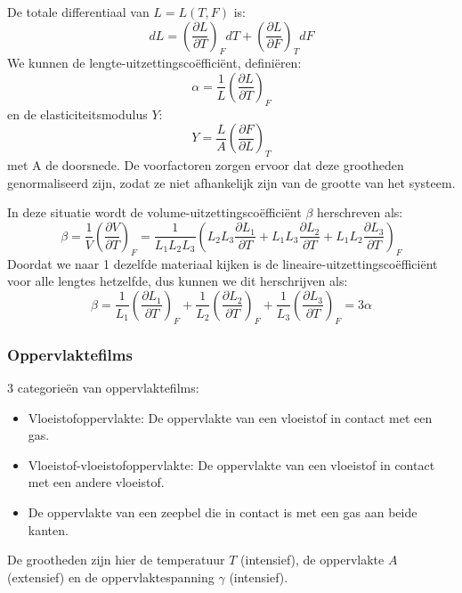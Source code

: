 De totale differentiaal van \(L=L(T,F)\) is:
\[dL = \left( \frac{\partial L}{\partial T} \right)_F dT + \left( \frac{\partial L}{\partial F} \right)_T dF\]
We kunnen de lengte-uitzettingscoëfficiënt, definiëren:
\begin{equation}
    \label{eq: lengte-uitzettingscoefficient}
    \alpha = \frac{1}{L} \left( \frac{\partial L}{\partial T} \right)_F
\end{equation}
en de elasticiteitsmodulus \(Y\):
\begin{equation}
    \label{eq: elasticiteitsmodulus}
    Y =  \frac{L}{A}\left( \frac{\partial F}{\partial L} \right)_T
\end{equation}
met A de doorsnede. De voorfactoren zorgen ervoor dat deze grootheden genormaliseerd zijn, zodat ze niet afhankelijk zijn van de grootte van het systeem.

In deze situatie wordt de volume-uitzettingscoëfficiënt \(\beta\) herschreven als:
\[\beta = \frac{1}{V} \left( \frac{\partial V}{\partial T} \right)_F = \frac{1}{L_1L_2L_3} \left( L_2L_3\frac{\partial L_1}{\partial T} + L_1L_3\frac{\partial L_2}{\partial T} + L_1L_2\frac{\partial L_3}{\partial T} \right)_F \]
Doordat we naar 1 dezelfde materiaal kijken is de lineaire-uitzettingscoëfficiënt voor alle lengtes hetzelfde, dus kunnen we dit herschrijven als:
\[\beta =  \frac{1}{L_1}\left(\frac{\partial L_1}{\partial T}\right)_F + \frac{1}{L_2}\left(\frac{\partial L_2}{\partial T}\right)_F + \frac{1}{L_3}\left(\frac{\partial L_3}{\partial T}\right)_F  = 3 \alpha\]

\subsubsection{Oppervlaktefilms}

3 categorieën van oppervlaktefilms:
\begin{itemize}
    \item Vloeistofoppervlakte: De oppervlakte van een vloeistof in contact met een gas.
    \item Vloeistof-vloeistofoppervlakte: De oppervlakte van een vloeistof in contact met een andere vloeistof.
    \item De oppervlakte van een zeepbel die in contact is met een gas aan beide kanten.
\end{itemize}

De grootheden zijn hier de temperatuur \(T\) (intensief), de oppervlakte \(A\) (extensief) en de oppervlaktespanning \(\gamma\) (intensief).

